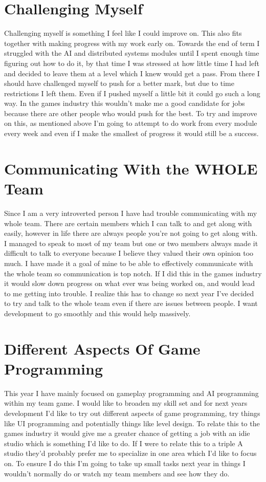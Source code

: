 \documentclass{scrartcl}
\begin{document}
\section{Challenging Myself}
Challenging myself is something I feel like I could improve on. This also fits together with making progress with my work early on. Towards the end of term I struggled with the AI and distributed systems modules until I spent enough time figuring out how to do it, by that time I was stressed at how little time I had left and decided to leave them at a level which I knew would get a pass. From there I should have challenged myself to push for a better mark, but due to time restrictions I left them. Even if I pushed myself a little bit it could go such a long way. In the games industry this wouldn't make me a good candidate for jobs because there are other people who would push for the best. To try and improve on this, as mentioned above I'm going to attempt to do work from every module every week and even if I make the smallest of progress it would still be a success.


\section{Communicating With the WHOLE Team}
Since I am a very introverted person I have had trouble communicating with my whole team. There are certain members which I can talk to and get along with easily, however in life there are always people you're not going to get along with. I managed to speak to most of my team but one or two members always made it difficult to talk to everyone because I believe they valued their own opinion too much. I have made it a goal of mine to be able to effectively communicate with the whole team so communication is top notch. If I did this in the games industry it would slow down progress on what ever was being worked on, and would lead to me getting into trouble. I realize this has to change so next year I've decided to try and talk to the whole team even if there are issues between people. I want development to go smoothly and this would help massively.


\section{Different Aspects Of Game Programming}
This year I have mainly focused on gameplay programming and AI programming within my team game. I would like to broaden my skill set and for next years development I'd like to try out different aspects of game programming, try things like UI programming and potentially things like level design. To relate this to the games industry it would give me a greater chance of getting a job with an idie studio which is something I'd like to do. If I were to relate this to a triple A studio they'd probably prefer me to specialize in one area which I'd like to focus on. To ensure I do this I'm going to take up small tasks next year in things I wouldn't normally do or watch my team members and see how they do.
\end{document}
